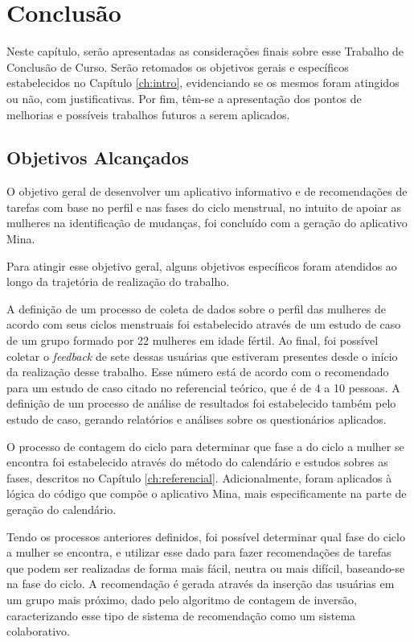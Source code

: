 \chapter[Conclusão]{Conclusão}
\label{ch:conclusao}

Neste capítulo, serão apresentadas as considerações finais sobre esse Trabalho de
Conclusão de Curso. Serão retomados os objetivos gerais e específicos estabelecidos no
Capítulo \ref{ch:intro}, evidenciando se os mesmos foram atingidos ou não, com justificativas. Por fim,
têm-se a apresentação dos pontos de melhorias e possíveis trabalhos futuros a serem aplicados.

\section{Objetivos Alcançados}

O objetivo geral de desenvolver um aplicativo informativo e de recomendações de tarefas 
com base no perfil e 
nas fases do ciclo menstrual, no intuito de apoiar as mulheres na identificação de mudanças, 
foi concluído com a geração 
do aplicativo Mina.

Para atingir esse objetivo geral, alguns objetivos específicos foram atendidos ao longo da trajetória de 
realização do trabalho. 

A definição de um processo de coleta de dados sobre o perfil das mulheres de acordo com seus ciclos 
menstruais foi estabelecido através de um estudo de caso de um grupo formado por 22 mulheres em idade fértil. 
Ao final, foi possível coletar o \emph{feedback} de sete dessas usuárias que estiveram presentes 
desde o início da realização desse trabalho. Esse número está de acordo com o recomendado para um 
estudo de caso citado no referencial teórico, que é de 4 a 10 pessoas. A definição de um processo de 
análise de resultados foi estabelecido também pelo estudo de caso, gerando 
relatórios e análises sobre os questionários aplicados.

O processo de contagem do ciclo para determinar que fase a do ciclo a mulher se encontra foi estabelecido 
através do método do calendário e estudos sobres as fases, descritos no Capítulo \ref{ch:referencial}. Adicionalmente, foram 
aplicados à lógica do código que compõe o aplicativo Mina, mais especificamente na parte de geração do calendário.

Tendo os processos anteriores definidos, foi possível determinar qual fase do ciclo a mulher 
se encontra, e utilizar esse dado para fazer recomendações de tarefas que podem 
ser realizadas de forma mais fácil, neutra ou mais difícil, baseando-se na fase do ciclo. A 
recomendação é gerada 
através da inserção das usuárias em um grupo mais próximo, dado pelo algoritmo de contagem de 
inversão, caracterizando esse tipo de sistema de recomendação como um sistema colaborativo.

